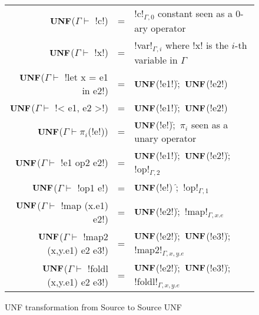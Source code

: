 \begin{figure*}[t]
    \begin{tabular}{r c l}
    $\mathbf{UNF}$($\Gamma\vdash $ !c!) &=& !c!$_{\Gamma,0}$ constant seen as a 0-ary operator\\
    $\mathbf{UNF}$($\Gamma\vdash $ !x!) &=& !var!$_{\Gamma,i}$ where !x! is the $i$-th variable in $\Gamma$ \\
    $\mathbf{UNF}$($\Gamma\vdash $ !let x = e1 in e2!) &=& $\mathbf{UNF}$(!e1!)$\widehat{;}$ $\mathbf{UNF}$(!e2!) \\ 
    $\mathbf{UNF}$($\Gamma\vdash $ !< e1, e2 >!) &=& $\mathbf{UNF}$(!e1!)$\widehat{;}$ $\mathbf{UNF}$(!e2!) \\ 
    $\mathbf{UNF}$($\Gamma\vdash \pi_i$(!e!)) &=& $\mathbf{UNF}$(!e!)$\widehat{;}$ $\pi_i$ seen as a unary operator\\
    $\mathbf{UNF}$($\Gamma\vdash $ !e1 op2 e2!) &=& $\mathbf{UNF}$(!e1!)$\widehat{;}$ $\mathbf{UNF}$(!e2!)$\widehat{;}$ !op!$_{\Gamma,2}$\\
    $\mathbf{UNF}$($\Gamma\vdash $ !op1 e!) &=& $\mathbf{UNF}$(!e!) $\widehat{;}$ !op!$_{\Gamma,1}$ \\
    $\mathbf{UNF}$($\Gamma\vdash $ !map (x.e1) e2!) &=& $\mathbf{UNF}$(!e2!)$\widehat{;}$ !map!$_{\Gamma,x.e}$\\
    $\mathbf{UNF}$($\Gamma\vdash $ !map2 (x,y.e1) e2 e3!) &=& $\mathbf{UNF}$(!e2!)$\widehat{;}$ $\mathbf{UNF}$(!e3!)$\widehat{;}$ !map2!$_{\Gamma, x,y.e}$ \\ 
    $\mathbf{UNF}$($\Gamma\vdash $ !foldl (x,y.e1) e2 e3!) &=& $\mathbf{UNF}$(!e2!)$\widehat{;}$ $\mathbf{UNF}$(!e3!)$\widehat{;}$ !foldl!$_{\Gamma, x,y.e}$ \\  
    \end{tabular}
    \caption{UNF transformation from Source to Source UNF}
    \label{fig:source_to_unf}
    \end{figure*}